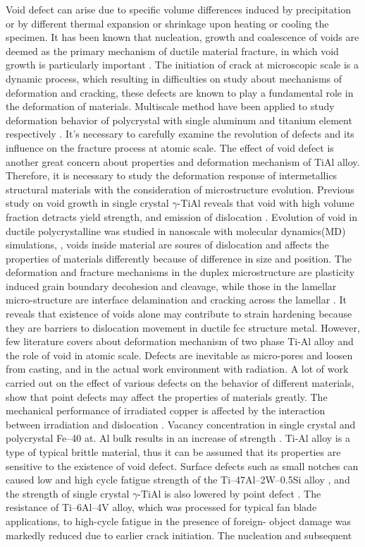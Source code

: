 \documentclass[Unknown,article,submit,moreauthors,pdftex,10pt,a4paper]{Definitions/mdpi}
\begin{document}
Void defect can arise due to specific volume differences induced by precipitation or by different thermal expansion or shrinkage upon heating or cooling the specimen. It has been known that nucleation, growth and coalescence of voids are deemed as the primary mechanism of ductile material fracture, in which void growth is particularly important \cite{Hempel2017a}. The initiation of crack at microscopic scale is a dynamic process, which resulting in difficulties on study about  mechanisms of deformation and cracking, these defects are known to play a fundamental role in the deformation of materials. Multiscale method have been applied to study deformation behavior of polycrystal with single aluminum \cite{Groh2009} and titanium element respectively \cite{Liu2018}. It's necessary to carefully examine the revolution of defects and its influence on the fracture process at atomic scale. The effect of void defect is another great concern about properties and deformation mechanism  of TiAl alloy.  Therefore, it is necessary to study the deformation response of intermetallics structural materials with the consideration of microstructure evolution. Previous study on void growth in single crystal $\gamma$-TiAl reveals that void with high volume fraction detracts yield strength, and emission of dislocation \cite{Tang2014, Xu2011}. Evolution of void in ductile polycrystalline was studied in nanoscale with molecular dynamics(MD) simulations, \cite{Jing2018a,Elkhateeb2018}, voids inside material are soures of dislocation and affects the properties of materials differently because of difference in size and position.  The deformation and fracture mechanisms in the duplex microstructure are plasticity induced grain boundary decohesion and cleavage, while those in the lamellar micro-structure are interface delamination and cracking across the lamellar \cite{Tang2014}. It reveals that existence of voids alone may contribute to strain hardening because they are barriers to dislocation movement in ductile fcc structure metal\cite{Xiong2015}. However, few literature covers about deformation mechanism of two phase Ti-Al alloy and the role of void in atomic scale. Defects are inevitable as micro-pores and loosen from casting, and in the actual work environment with radiation. A lot of work carried out on the  effect of various defects on the behavior of different materials, show that point defects may affect the properties of materials greatly. The mechanical performance of irradiated copper is affected by the interaction between irradiation and dislocation \cite{Kiener2011}. Vacancy concentration in single crystal and polycrystal Fe–40 at. Al bulk results in an increase of strength \cite{Yang1998}. Ti-Al alloy is a type of typical brittle material, thus it can be assumed that its properties are sensitive to the existence of void defect. Surface defects such as small notches can caused low and high cycle fatigue strength of the Ti–47Al–2W–0.5Si alloy \cite{Nazmy2001}, and the strength of single crystal $\gamma$-TiAl is also lowered by point defect \cite{Wu2016}. The resistance of Ti–6Al–4V alloy, which was processed for typical fan blade applications, to high-cycle fatigue in the presence of foreign- object damage was markedly reduced due to earlier crack initiation.  The nucleation and subsequent 
\end{document}
